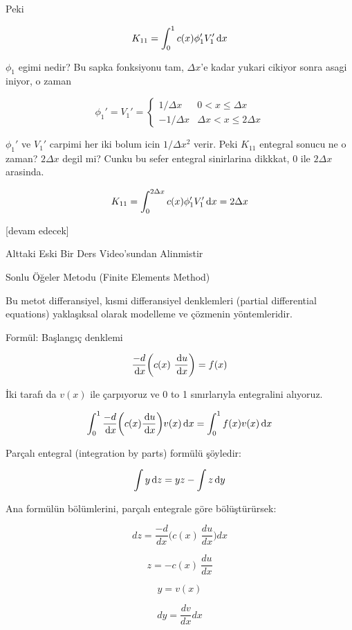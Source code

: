\documentclass[12pt,fleqn]{article}\usepackage{../../common}
\begin{document}
Peki

$$
K_{11} = \int _{0}^{1} c(x) \phi_1' V_1' \,\mathrm{d} x
$$

$\phi_1$ egimi nedir? Bu sapka fonksiyonu tam, $\Delta x$'e kadar yukari
cikiyor sonra asagi iniyor, o zaman

$$
\phi_1' = V_1' =
\left\{ \begin{array}{rc}
1/\Delta x & 0 < x \le \Delta x \\
-1/\Delta x & \Delta x < x \le 2\Delta x 
\end{array} \right.
$$

$\phi_1'$ ve $V_1'$ carpimi her iki bolum icin $1/\Delta x^2$ verir. Peki
$K_{11}$ entegral sonucu ne o zaman? $2 \Delta x$ degil mi? Cunku bu sefer
entegral sinirlarina dikkkat, 0 ile $2\Delta x$ arasinda. 

$$
K_{11} = \int _{0}^{2\Delta x} c(x) \phi_1' V_1' \,\mathrm{d} x = 2\Delta x
$$












[devam edecek]


Alttaki Eski Bir Ders Video'sundan Alinmistir

Sonlu Öğeler Metodu (Finite Elements Method)

Bu metot differansiyel, kısmi differansiyel denklemleri (partial differential
equations) yaklaşıksal olarak modelleme ve çözmenin yöntemleridir.

Formül: Başlangıç denklemi

$$ \frac{-d}{\,\mathrm{d} x} \bigg( c(x) \ \frac{\,\mathrm{d} u}{\,\mathrm{d} x} \bigg) = f(x) $$

İki tarafı da  $v(x)$ ile çarpıyoruz ve 0 to 1 sınırlarıyla entegralini alıyoruz.

$$
\int_0^1 \frac{-d}{\,\mathrm{d} x} \bigg( c(x) \frac{\,\mathrm{d} u}{\,\mathrm{d} x} \bigg) v(x)\,\mathrm{d} x
= \int_0^1 f(x)v(x) \,\mathrm{d} x
$$

Parçalı entegral (integration by parts) formülü şöyledir:

$$ \int y \,\mathrm{d} z = y  z - \int z \,\mathrm{d} y $$

Ana formülün bölümlerini, parçalı entegrale göre bölüştürürsek:

$$ dz = \frac{-d}{dx} \bigg( c(x) \ \frac{du}{dx} \bigg) dx  $$

$$ z = - c(x) \ \frac{du}{dx}  $$

$$ y = v(x)  $$

$$ dy = \frac{dv}{dx}dx $$
\end{document}
